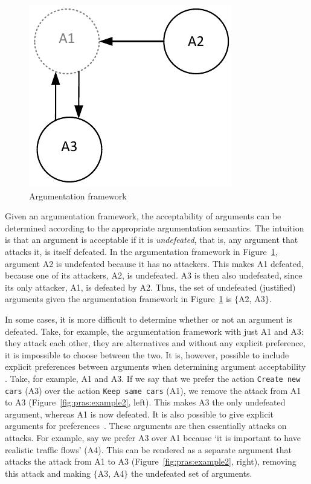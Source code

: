 \begin{figure}[ht]
\centering
\includegraphics[scale=0.8]{img/Fig1}
\caption{Argumentation framework}
\label{fig:pras:example}
\end{figure}

Given an argumentation framework, the acceptability of arguments can be determined according to the appropriate argumentation semantics. The intuition is that an argument is acceptable if it is \emph{undefeated}, that is, any argument that attacks it, is itself defeated. In the argumentation framework in Figure~\ref{fig:pras:example}, argument A2 is undefeated because it has no attackers. This makes A1 defeated, because one of its attackers, A2, is undefeated. A3 is then also undefeated, since its only attacker, A1, is defeated by A2. Thus, the set of undefeated (justified) arguments given the argumentation framework in Figure~\ref{fig:pras:example} is $\{$A2, A3$\}$. 

In some cases, it is more difficult to determine whether or not an argument is defeated. Take, for example, the argumentation framework with just A1 and A3: they attack each other, they are alternatives and without any explicit preference, it is impossible to choose between the two. It is, however, possible to include explicit preferences between arguments when determining argument acceptability \cite{amgoud2002reasoning}. Take, for example, A1 and A3. If we say that we prefer the action  \texttt{Create new cars} (A3) over the action  \texttt{Keep same cars} (A1), we remove the attack from A1 to A3 (Figure~\ref{fig:pras:example2}, left). This makes A3 the only undefeated argument, whereas A1 is now defeated. It is also possible to give explicit arguments for preferences~\cite{modgil2009}. These arguments are then essentially attacks on attacks. For example, say we prefer A3 over A1 because `it is important to have realistic traffic flows' (A4). This can be rendered as a separate argument that attacks the attack from A1 to A3 (Figure~\ref{fig:pras:example2}, right), removing this attack and making $\{$A3, A4$\}$ the undefeated set of arguments.

